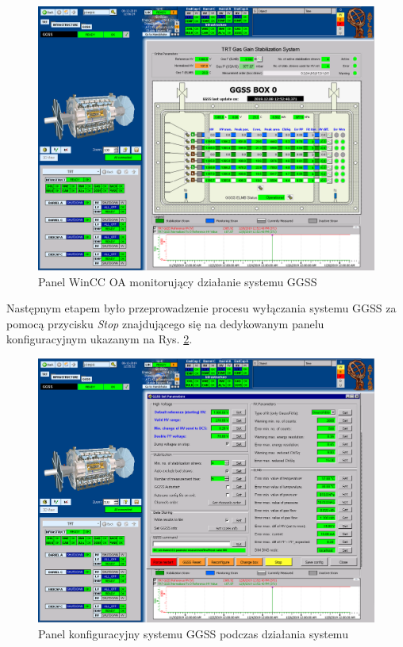 \begin{figure}[H]
\centering
\caption{Panel WinCC OA monitorujący działanie systemu GGSS}
\label{fig:ggss}
\includegraphics[width=\textwidth]{res/png/ggssStraw}
\end{figure}

\newpage
Następnym etapem było przeprowadzenie procesu wyłączania systemu GGSS za pomocą przycisku \textit{Stop} znajdującego się na dedykowanym panelu konfiguracyjnym ukazanym na Rys. \ref{fig:ggsspanel}. 

\begin{figure}[H]
\centering
\caption{Panel konfiguracyjny systemu GGSS podczas działania systemu}
\label{fig:ggsspanel}
\includegraphics[width=\textwidth]{res/png/ggssConfig}
\end{figure}


